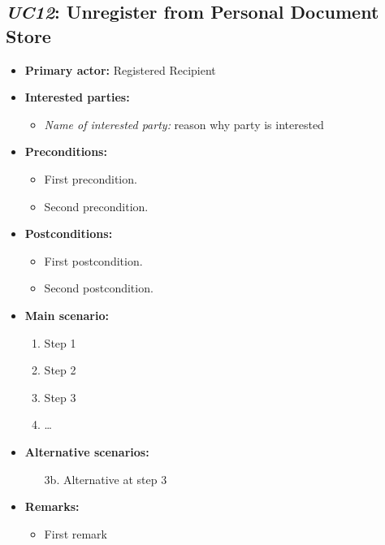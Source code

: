 \documentclass[a4paper,10pt]{article}
\begin{document}
\subsection{\emph{UC12}: Unregister from Personal Document Store}
\begin{itemize}
    \item \textbf{Primary actor:} Registered Recipient
    \item \textbf{Interested parties:} 
        \begin{itemize}
            \item \textit{Name of interested party:} reason why party is interested
        \end{itemize}

    \item \textbf{Preconditions:}
        \begin{itemize}
            \item First precondition.
            \item Second precondition.
        \end{itemize}

    \item \textbf{Postconditions:}
        \begin{itemize}
            \item First postcondition.
            \item Second postcondition.
        \end{itemize}
        
    \item \textbf{Main scenario:} 
    \begin{enumerate}
       \item Step 1
       \item Step 2
       \item Step 3
       \item \ldots
    \end{enumerate}

    \item \textbf{Alternative scenarios:} 
    \begin{enumerate}
        \item [3b.] Alternative at step 3
    \end{enumerate}
    
    \item \textbf{Remarks:}
        \begin{itemize}
            \item First remark
        \end{itemize}
\end{itemize}
\end{document}

